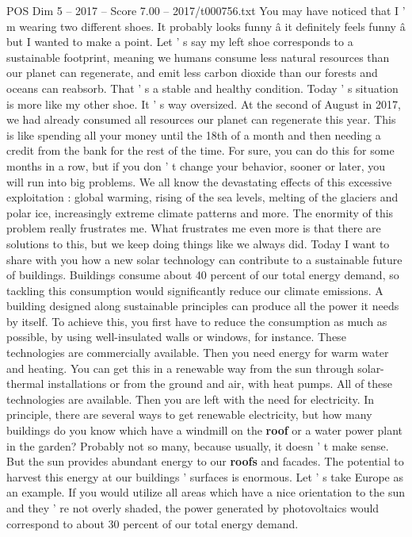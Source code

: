 \begin{textsample}{POS Dim 5 – 2017 – Score 7.00 – 2017/t000756.txt}  \label{ex:f5_pos_060}
You may have noticed that I ' m wearing two different shoes.
It probably looks funny â it definitely feels funny â but I wanted to make a point.
Let ' s say my left shoe corresponds to a sustainable footprint, meaning we humans consume less natural resources than our planet can regenerate, and emit less carbon dioxide than our forests and oceans can reabsorb.
That ' s a stable and healthy condition.
Today ' s situation is more like my other shoe.
It ' s way oversized.
At the second of August in 2017, we had already consumed all resources our planet can regenerate this year.
This is like spending all your money until the 18th of a month and then needing a credit from the bank for the rest of the time.
For sure, you can do this for some months in a row, but if you don ' t change your behavior, sooner or later, you will run into big problems.
We all know the devastating effects of this excessive exploitation : global warming, rising of the sea levels, melting of the glaciers and polar ice, increasingly extreme climate patterns and more.
The enormity of this problem really frustrates me.
What frustrates me even more is that there are solutions to this, but we keep doing things like we always did.
Today I want to share with you how a new solar technology can contribute to a sustainable future of buildings.
Buildings consume about 40 percent of our total energy demand, so tackling this consumption would significantly reduce our climate emissions.
A building designed along sustainable principles can produce all the power it needs by itself.
To achieve this, you first have to reduce the consumption as much as possible, by using well-insulated walls or windows, for instance.
These technologies are commercially available.
Then you need energy for warm water and heating.
You can get this in a renewable way from the sun through solar- thermal installations or from the ground and air, with heat pumps.
All of these technologies are available.
Then you are left with the need for electricity.
In principle, there are several ways to get renewable electricity, but how many buildings do you know which have a windmill on the \textbf{roof} or a water power plant in the garden?
Probably not so many, because usually, it doesn ' t make sense.
But the sun provides abundant energy to our \textbf{roofs} and facades.
The potential to harvest this energy at our buildings ' surfaces is enormous.
Let ' s take Europe as an example.
If you would utilize all areas which have a nice orientation to the sun and they ' re not overly shaded, the power generated by photovoltaics would correspond to about 30 percent of our total energy demand.

\end{textsample}

